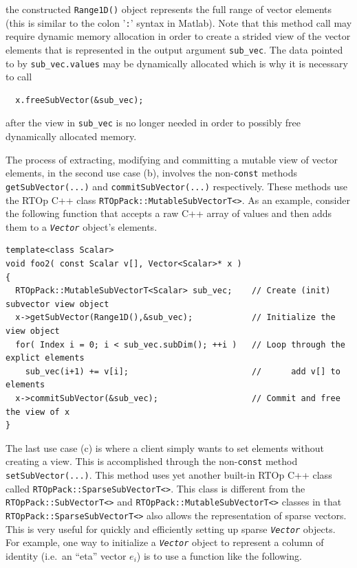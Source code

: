 {}\noindent{}the constructed \texttt{Range1D()} object represents the full range of
vector elements (this is similar to the colon '\texttt{:}' syntax
in Matlab).  Note that this method call may require dynamic memory
allocation in order to create a strided view of the vector elements
that is represented in the output argument \texttt{sub\_vec}.  The
data pointed to by \texttt{sub\_vec.values} may be dynamically
allocated which is why it is necessary to call

{\scriptsize\begin{verbatim}
  x.freeSubVector(&sub_vec);
\end{verbatim}}

{}\noindent{}after the view in \texttt{sub\_vec} is no longer needed in order to possibly
free dynamically allocated memory.

The process of extracting, modifying and committing a mutable view of
vector elements, in the second use case (b), involves the
non-\texttt{const} methods \texttt{getSubVector(...)} and
\texttt{commit\-Sub\-Vector(...)} respectively.  These methods use the
RTOp C++ class \texttt{RTOpPack::\-Mutable\-Sub\-VectorT<>}.  As an
example, consider the following function that accepts a raw C++ array
of values and then adds them to a \texttt{\textit{Vector}} object's
elements.

{\scriptsize\begin{verbatim}
template<class Scalar>
void foo2( const Scalar v[], Vector<Scalar>* x )
{
  RTOpPack::MutableSubVectorT<Scalar> sub_vec;    // Create (init) subvector view object
  x->getSubVector(Range1D(),&sub_vec);            // Initialize the view object
  for( Index i = 0; i < sub_vec.subDim(); ++i )   // Loop through the explict elements
    sub_vec(i+1) += v[i];                         //      add v[] to elements
  x->commitSubVector(&sub_vec);                   // Commit and free the view of x
}
\end{verbatim}}

The last use case (c) is where a client simply wants to set elements
without creating a view.  This is accomplished through the
non-\texttt{const} method \texttt{set\-Sub\-Vector(...)}.  This method
uses yet another built-in RTOp C++ class called
\texttt{RTOpPack::\-Sparse\-Sub\-VectorT<>}.  This class is different from the
\texttt{RTOpPack::\-SubVectorT<>} and
\texttt{RTOpPack::\-Mutable\-Sub\-VectorT<>} classes in that
\texttt{RTOpPack::\-Sparse\-Sub\-VectorT<>} also allows the representation of 
sparse vectors.  This is very useful for quickly and efficiently
setting up sparse \texttt{\textit{Vector}} objects.  For example, one
way to initialize a \texttt{\textit{Vector}} object to represent a
column of identity (i.e.~an ``eta'' vector $e_i$) is to use a function
like the following.

